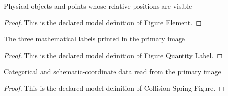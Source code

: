 \begin{definition}
  \label{def:physics:phyx-mini-0255:phyxminiproblems-problemphyxmini0255-figureelement}
  Physical objects and points whose relative positions are visible
\end{definition}
\begin{proof}
  This is the declared model definition of Figure Element.
\end{proof}
\begin{definition}
  \label{def:physics:phyx-mini-0255:phyxminiproblems-problemphyxmini0255-figurequantitylabel}
  The three mathematical labels printed in the primary image
\end{definition}
\begin{proof}
  This is the declared model definition of Figure Quantity Label.
\end{proof}
\begin{definition}
  \label{def:physics:phyx-mini-0255:phyxminiproblems-problemphyxmini0255-collisionspringfigure}
  Categorical and schematic-coordinate data read from the primary image
\end{definition}
\begin{proof}
  This is the declared model definition of Collision Spring Figure.
\end{proof}
